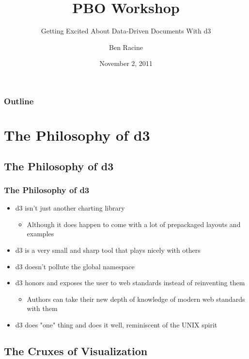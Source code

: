 \documentclass{beamer}
\title{PBO Workshop}
\subtitle{Getting Excited About Data-Driven Documents With d3}
\author{Ben Racine \inst{1} }
\institute{\inst{1} Cornerstone Systems NW }
\date{November 2, 2011}
\begin{document}
\begin{frame}
    \frametitle{}
    \titlepage
\end{frame}


 \begin{frame}
    \scriptsize{
        \frametitle{Outline}
        \tableofcontents[pausesections]
    }
 \end{frame}



\section{The Philosophy of d3}


\subsection{The Philosophy of d3}

\begin{frame}
\frametitle{The Philosophy of d3}
\begin{itemize}
\item d3 isn't just another charting library
    \begin{itemize}
    \item Although it does happen to come with a lot of prepackaged layouts and examples
    \end{itemize}
\item d3 is a very small and sharp tool that plays nicely with others
\item d3 doesn't pollute the global namespace
\item d3 honors and exposes the user to web standards instead of reinventing them
    \begin{itemize}
    \item Authors can take their new depth of knowledge of modern web standards with them
    \end{itemize}
\item d3 does "one" thing and does it well, reminiscent of the UNIX spirit
\end{itemize}
\end{frame}


\subsection{The Cruxes of Visualization}
\end{document}
